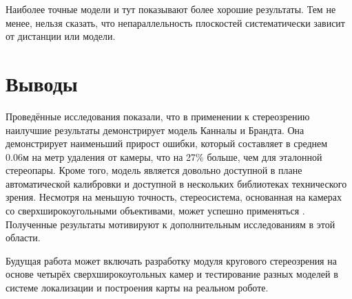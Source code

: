 
Наиболее точные модели и тут показывают более хорошие результаты. Тем не менее, нельзя сказать, что непараллельность плоскостей систематически зависит от 
дистанции или модели. 

\section{Выводы}
\label{conclusion}

Проведённые исследования показали, что в применении к стереозрению наилучшие результаты демонстрирует модель Канналы и Брандта. Она демонстрирует наименьший 
прирост ошибки, который составляет в среднем 0.06м на метр удаления от камеры, что на 27\% больше, чем для эталонной стереопары. Кроме того, модель является довольно доступной 
в плане автоматической калибровки и доступной в нескольких библиотеках технического зрения. Несмотря на меньшую точность, 
стереосистема, основанная на камерах со сверхширокоугольными объективами, может успешно применяться \cite{}. Полученные результаты мотивируют к дополнительным 
исследованиям в этой области.

Будущая работа может включать разработку модуля кругового стереозрения на основе четырёх сверхширокоугольных камер и тестирование разных моделей в 
системе локализации и построения карты на реальном роботе. 


\newpage




